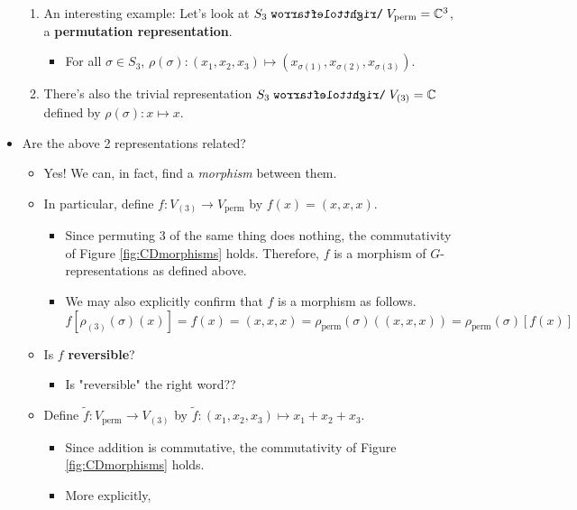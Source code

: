 \documentclass[../notes.tex]{subfiles}
\begin{document}
\begin{itemize}
\begin{enumerate}
        \item An interesting example: Let's look at $S_3\acts V_\text{perm}=\C^3$, a \textbf{permutation representation}.
        \begin{itemize}
            \item For all $\sigma\in S_3$, $\rho(\sigma):(x_1,x_2,x_3)\mapsto(x_{\sigma(1)},x_{\sigma(2)},x_{\sigma(3)})$.
        \end{itemize}
        \item There's also the trivial representation $S_3\acts V_{(3)}=\C$ defined by $\rho(\sigma):x\mapsto x$.
    \end{enumerate}
    \item Are the above 2 representations related?
    \begin{itemize}
        \item Yes! We can, in fact, find a \emph{morphism} between them.
        \item In particular, define $f:V_{(3)}\to V_\text{perm}$ by $f(x)=(x,x,x)$.
        \begin{itemize}
            \item Since permuting 3 of the same thing does nothing, the commutativity of Figure \ref{fig:CDmorphisms} holds. Therefore, $f$ is a morphism of $G$-representations as defined above.
            \item We may also explicitly confirm that $f$ is a morphism as follows.
            \begin{equation*}
                f[\rho_{(3)}(\sigma)(x)] = f(x)
                = (x,x,x)
                = \rho_\text{perm}(\sigma)((x,x,x))
                = \rho_\text{perm}(\sigma)[f(x)]
            \end{equation*}
        \end{itemize}
        \item Is $f$ \textbf{reversible}?
        \begin{itemize}
            \item Is "reversible" the right word??
        \end{itemize}
        \item Define $\tilde{f}:V_\text{perm}\to V_{(3)}$ by $\tilde{f}:(x_1,x_2,x_3)\mapsto x_1+x_2+x_3$.
        \begin{itemize}
            \item Since addition is commutative, the commutativity of Figure \ref{fig:CDmorphisms} holds.
            \item More explicitly,
            \begin{align*}

\end{align*}
\end{itemize}
\end{itemize}
\end{itemize}
\end{document}
